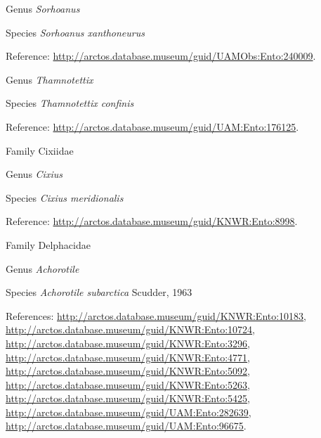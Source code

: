 \documentclass[9pt, article]{memoir}
\begin{document}
\begin{multicols}{2}
\vspace{6pt}\noindent\hspace{30pt}Genus \textit{Sorhoanus}


\vspace{6pt}\noindent\hspace{36pt}Species \textit{Sorhoanus xanthoneurus}


Reference: 
\url{http://arctos.database.museum/guid/UAMObs:Ento:240009}.

\vspace{6pt}\noindent\hspace{30pt}Genus \textit{Thamnotettix}


\vspace{6pt}\noindent\hspace{36pt}Species \textit{Thamnotettix confinis}


Reference: 
\url{http://arctos.database.museum/guid/UAM:Ento:176125}.

\vspace{6pt}\noindent\hspace{24pt}Family Cixiidae


\vspace{6pt}\noindent\hspace{30pt}Genus \textit{Cixius}


\vspace{6pt}\noindent\hspace{36pt}Species \textit{Cixius meridionalis}


Reference: 
\url{http://arctos.database.museum/guid/KNWR:Ento:8998}.

\vspace{6pt}\noindent\hspace{24pt}Family Delphacidae


\vspace{6pt}\noindent\hspace{30pt}Genus \textit{Achorotile}


\vspace{6pt}\noindent\hspace{36pt}Species \textit{Achorotile subarctica} Scudder, 1963


References: 
\url{http://arctos.database.museum/guid/KNWR:Ento:10183}, 
\url{http://arctos.database.museum/guid/KNWR:Ento:10724}, 
\url{http://arctos.database.museum/guid/KNWR:Ento:3296}, 
\url{http://arctos.database.museum/guid/KNWR:Ento:4771}, 
\url{http://arctos.database.museum/guid/KNWR:Ento:5092}, 
\url{http://arctos.database.museum/guid/KNWR:Ento:5263}, 
\url{http://arctos.database.museum/guid/KNWR:Ento:5425}, 
\url{http://arctos.database.museum/guid/UAM:Ento:282639}, 
\url{http://arctos.database.museum/guid/UAM:Ento:96675}.


\end{multicols}
\end{document}
